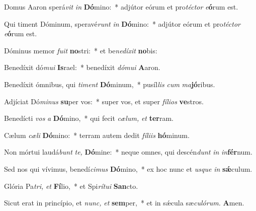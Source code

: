 \item Domus Aaron sperá\textit{vit} \textit{in} \textbf{Dó}mino:~* adjútor eórum et pro\textit{téctor} \textit{e}\textbf{ó}rum est.
\item Qui timent Dóminum, speravé\textit{runt} \textit{in} \textbf{Dó}mino:~* adjútor eórum et pro\textit{téctor} \textit{e}\textbf{ó}rum est.
\item Dóminus memor \textit{fuit} \textbf{no}stri:~* et be\textit{nedíxit} \textbf{no}bis:
\item Benedíxit dó\textit{mui} \textbf{Is}rael:~* benedíxit \textit{dómui} \textbf{A}aron.
\item Benedíxit ómnibus, qui \textit{timent} \textbf{Dó}minum,~* pusíl\textit{lis} \textit{cum} \textit{ma}\textbf{jó}ribus.
\item Adjíciat Dó\textit{minus} \textbf{su}per vos:~* super vos, et super \textit{fílios} \textbf{ve}stros.
\item Benedícti \textit{vos} \textit{a} \textbf{Dó}mino,~* qui fecit \textit{cælum,} \textit{et} \textbf{ter}ram.
\item Cælum \textit{cæli} \textbf{Dó}mino:~* terram autem dedit \textit{fíliis} \textbf{hó}minum.
\item Non mórtui laudá\textit{bunt} \textit{te,} \textbf{Dó}mine:~* neque omnes, qui descén\textit{dunt} \textit{in} \textit{in}\textbf{fér}num.
\item Sed nos qui vívimus, benedí\textit{cimus} \textbf{Dó}mino,~* ex hoc nunc et \textit{usque} \textit{in} \textbf{sǽ}culum.
\item Glória Pa\hspace*{0.03em}\textit{tri,} \textit{et} \textbf{Fí}lio,~* et Spi\hspace*{0.03em}\textit{rítui} \textbf{San}cto.
\item Sicut erat in princípio, et \textit{nunc,} \textit{et} \textbf{sem}per,~* et in sǽcula sæ\hspace*{0.03em}\textit{culórum.} \textbf{A}men.
